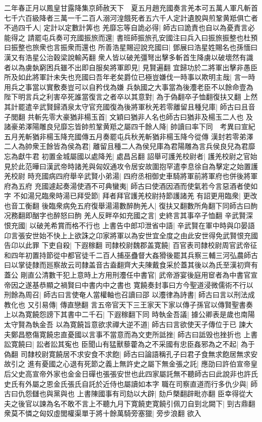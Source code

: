 二年春正月以鳳皇甘露降集京師赦天下　夏五月趙充國奏言羌本可五萬人軍凡斬首七千六百級降者三萬一千二百人溺河湟餓死者五六千人定計遺脫與煎鞏黄羝俱亡者不過四千人|{
	定計以定數計筭也}
羌靡忘等自詭必得|{
	師古曰詭責也自以為憂責言必能得之}
請罷屯兵奏可充國振旅而還|{
	書班師振旅孔安國注曰兵入曰振旅振整也杜預曰振整也旅衆也言振衆而還也}
所善浩星賜迎說充國曰|{
	鄧展曰浩星姓賜名也孫愐曰漢又有浩星公治穀梁說輸芮翻}
衆人皆以破羌彊弩出擊多斬首生降虜以破壞然有識者以為虜埶窮困兵雖不出即自服矣將軍即見|{
	見賢遍翻}
宜歸功於二將軍出擊非愚臣所及如此將軍計未失也充國曰吾年老矣爵位已極豈嫌伐一時事以欺明主哉|{
	言一時用兵之事當以實敷奏豈可以自矜伐為嫌}
兵埶國之大事當為後灋老臣不以餘命壹為陛下明言兵之利害卒死誰當復言之者卒以其意對|{
	為于偽翻卒子恤翻復扶又翻}
上然其計罷遣辛武賢歸酒泉太守官充國復為後將軍秋羌若零離留且種兒庫|{
	師古曰且音子閭翻}
共斬先零大豪猶非楊玉首|{
	文穎曰猶非人名也師古曰猶非及楊玉二人也}
及諸豪弟澤陽雕良兒靡忘皆帥煎鞏黄羝之屬四千餘人降|{
	帥讀曰率下同　考異曰宣紀五月羌斬猶非楊玉降充國傳五月奏罷屯兵秋羌斬猶非楊玉降今從傳}
漢封若零弟澤二人為帥衆王餘皆為侯為君|{
	離留且種二人為侯兒庫為君陽雕為言兵侯良兒為君靡忘為獻牛君}
初置金城屬國以處降羌|{
	處昌呂翻}
詔舉可護羌校尉者|{
	護羌校尉之官始見於此范曄曰漢武帝時諸羌與匈奴通攻令居安故圍抱罕遣李息徐自為擊定之始置護羌校尉}
時充國病四府舉辛武賢小弟湯|{
	四府丞相御史車騎將軍前將軍府也併後將軍府為五府}
充國遽起奏湯使酒不可典蠻夷|{
	師古曰使酒因酒而使氣若今言惡酒者使如字}
不如湯兄臨衆時湯已拜受節|{
	拜者拜官護羌校尉持節護諸羌}
有詔更用臨衆|{
	更改也音工衡翻}
後臨衆病免五府復舉湯湯數醉䣱羌人|{
	復扶又翻數所角翻下同師古曰䣱况務翻即酗字也醉怒曰䣱}
羌人反畔卒如充國之言|{
	史終言其事卒子恤翻}
辛武賢深恨充國|{
	以破羌希賞而格不行也}
上書告中郎卭泄省中語|{
	辛武賢在軍中時與卬晏語卬言張安世始不快上上欲誅之卬家將軍以為安世宜全度之由此安世得免武賢恨充國告卬以此罪}
下吏自殺|{
	下遐稼翻}
司隸校尉魏郡盖寛饒|{
	百官表司隸校尉周官武帝征和四年初置持節從中都官徒千二百人捕巫蠱督大姦猾後罷其兵察三輔三河弘農師古曰以掌徒隸而廵察故云司隸盖音古盍翻齊大夫陳戴食采於蓋其後以為氏至漢初齊有蓋公}
剛直公清數干犯上意時上方用刑灋任中書官|{
	武帝游宴後庭用䆠者為中書官宣帝因之遂基恭顯之禍賢曰中書内中之書也}
寛饒奏封事曰方今聖道浸微儒術不行以刑餘為周召|{
	師古曰言使奄人當權軸也召讀曰邵}
以灋律為詩書|{
	師古曰言以刑法成教化也}
又引易傳|{
	傳直戀翻}
言五帝官天下三王家天下家以傳子孫官以傳賢聖書奏上以為寛饒怨謗下其書中二千石|{
	下遐稼翻下同}
時執金吾議|{
	據公卿表是歲也南陽太守賢為執金吾}
以為寛饒旨意欲求禪大逆不道|{
	師古曰言欲使天子傳位于已}
諫大夫鄭昌愍傷寛饒忠直憂國以言事不當意而為文吏所詆挫|{
	師古曰詆毁也挫折也}
上書訟寛饒曰|{
	訟者訟其寃也}
臣聞山有猛獸藜藿為之不采國有忠臣姦邪為之不起|{
	為于偽翻}
司隸校尉寛饒居不求安食不求飽|{
	師古曰論語稱孔子曰君子食無求飽居無求安故引之}
進有憂國之心退有死節之義上無許史之屬下無金張之託|{
	應劭曰許伯宣帝皇后父史高宣帝外家也金金日磾也張張安世也此四家屬託無不聽師古曰此說非也許氏史氏有外屬之恩金氏張氏自託於近侍也屬讀如本字}
職在司察直道而行多仇少與|{
	師古曰仇怨讎也與黨與也}
上書陳國事有司劾以大辟|{
	劾戶槩翻辟毗亦翻}
臣幸得從大夫之後官以諫為名不敢不言上不聽九月下寛饒吏寛饒引佩刀自剄北闕下|{
	剄古鼎翻}
衆莫不憐之匈奴虛閭權渠單于將十餘萬騎旁塞獵|{
	旁步浪翻}
欲入

